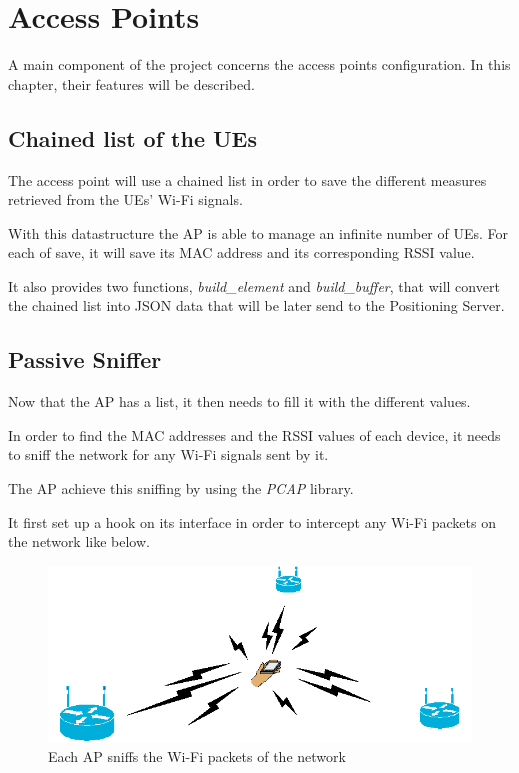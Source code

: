 \chapter{Access Points}

A main component of the project concerns the access points configuration. In
this chapter, their features will be described.

\section{Chained list of the UEs}

The access point will use a chained list in order to save the different
measures retrieved from the UEs' Wi-Fi signals.

With this datastructure the AP is able to manage an infinite number of UEs. For
each of save, it will save its MAC address and its corresponding RSSI value.

It also provides two functions, \emph{build\_element} and \emph{build\_buffer},
that will convert the chained list into JSON data that will be later send to
the Positioning Server.

\section{Passive Sniffer}

Now that the AP has a list, it then needs to fill it with the different values.

In order to find the MAC addresses and the RSSI values of each device, it needs
to sniff the network for any Wi-Fi signals sent by it.

The AP achieve this sniffing by using the \emph{PCAP} library.

It first set up a hook on its interface in order to intercept any Wi-Fi packets
on the network like below.

\begin{figure}[h]
  \centering
  \includegraphics[scale=.5]{./ap/mobile_with_aps.png}
  \caption{Each AP sniffs the Wi-Fi packets of the network}
\end{figure}

